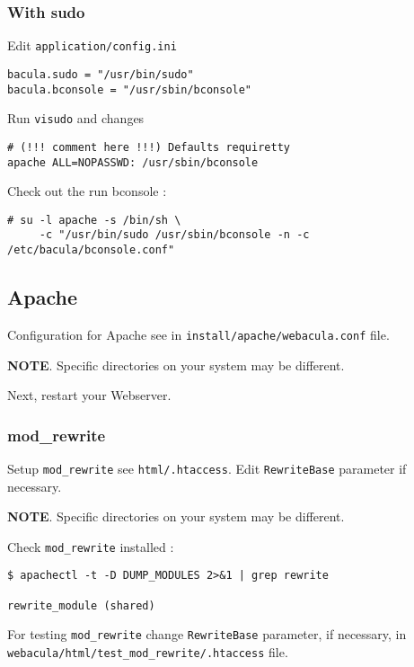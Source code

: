 \documentclass[10pt]{article}
\begin{document}
\subsubsection{With sudo}
\label{Install:Setting up to run bconsole from under Webacula:with sudo}

Edit \texttt{application/config.ini}
\begin{verbatim}
bacula.sudo = "/usr/bin/sudo"
bacula.bconsole = "/usr/sbin/bconsole"
\end{verbatim}

Run \texttt{visudo} and changes
\begin{verbatim}
# (!!! comment here !!!) Defaults requiretty
apache ALL=NOPASSWD: /usr/sbin/bconsole
\end{verbatim}

Check out the run bconsole :
\begin{verbatim}
# su -l apache -s /bin/sh \
     -c "/usr/bin/sudo /usr/sbin/bconsole -n -c /etc/bacula/bconsole.conf"
\end{verbatim}



\subsection{Apache}
\label{Install:Apache}

Configuration for Apache see in \texttt{install/apache/webacula.conf} file.

\textbf{NOTE}. Specific directories on your system may be different.

Next, restart your Webserver.



\subsubsection{mod\_rewrite}
\label{Install:Apache:mod rewrite}

Setup \texttt{mod\_rewrite} see \texttt{html/.htaccess}. Edit \texttt{RewriteBase} parameter if necessary.

\textbf{NOTE}. Specific directories on your system may be different.

Check \texttt{mod\_rewrite} installed :
\begin{verbatim}
$ apachectl -t -D DUMP_MODULES 2>&1 | grep rewrite

rewrite_module (shared)
\end{verbatim}

For testing \texttt{mod\_rewrite} change \texttt{RewriteBase} parameter, if necessary, in \texttt{webacula/html/test\_mod\_rewrite/.htaccess} file.
\end{document}
